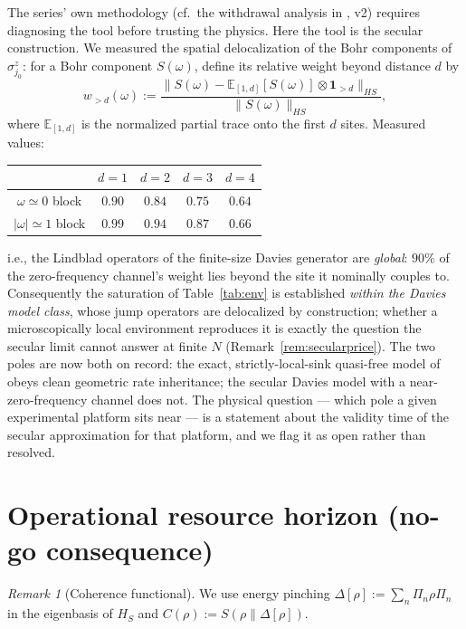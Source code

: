 \documentclass[11pt,a4paper]{article}
\theoremstyle{plain}
\theoremstyle{definition}
\theoremstyle{remark}
\newtheorem{remark}[theorem]{Remark}
\begin{document}
The series' own methodology (cf.\ the withdrawal analysis in \cite{HCut}, v2)
requires diagnosing the tool before trusting the physics. Here the tool is
the secular construction. We measured the spatial delocalization of the Bohr
components of $\sigma^z_{j_0}$: for a Bohr component $S(\omega)$, define its
relative weight beyond distance $d$ by
\begin{equation}
w_{>d}(\omega) := \frac{\big\|S(\omega) - \mathbb{E}_{[1,d]}[S(\omega)]
\otimes \mathbf{1}_{>d}\big\|_{HS}}{\|S(\omega)\|_{HS}},
\end{equation}
where $\mathbb{E}_{[1,d]}$ is the normalized partial trace onto the first $d$
sites. Measured values:
\begin{center}
\begin{tabular}{c|cccc}
 & $d=1$ & $d=2$ & $d=3$ & $d=4$\\
\hline
$\omega \simeq 0$ block & $0.90$ & $0.84$ & $0.75$ & $0.64$\\
$|\omega| \simeq 1$ block & $0.99$ & $0.94$ & $0.87$ & $0.66$\\
\end{tabular}
\end{center}
i.e., the Lindblad operators of the finite-size Davies generator are
\emph{global}: $90\%$ of the zero-frequency channel's weight lies beyond the
site it nominally couples to. Consequently the saturation of
Table~\ref{tab:env} is established \emph{within the Davies model class}, whose
jump operators are delocalized by construction; whether a microscopically
local environment reproduces it is exactly the question the secular limit
cannot answer at finite $N$ (Remark~\ref{rem:secularprice}). The two poles are
now both on record: the exact, strictly-local-sink quasi-free model of
\cite{HCut} obeys clean geometric rate inheritance; the secular Davies model
with a near-zero-frequency channel does not. The physical question --- which
pole a given experimental platform sits near --- is a statement about the
validity time of the secular approximation for that platform, and we flag it
as open rather than resolved.

\section{Operational resource horizon (no-go consequence)}\label{sec:nogo}

\begin{remark}[Coherence functional]
We use energy pinching $\Delta[\rho] := \sum_n \Pi_n\rho\Pi_n$ in the
eigenbasis of $H_S$ and $C(\rho) := S(\rho\|\Delta[\rho])$.
\end{remark}
\end{document}

